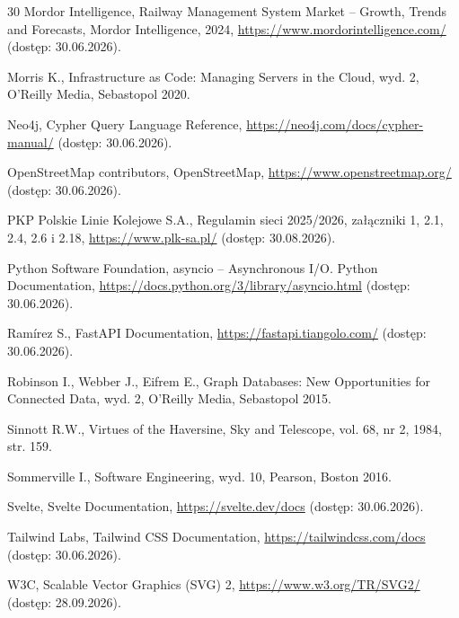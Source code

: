 \documentclass[twoside]{projektInzynierskiMS1z}
\begin{document}
\begin{thebibliography}{30}
 Mordor Intelligence, Railway Management System Market -- Growth, Trends and Forecasts, Mordor Intelligence, 2024, \url{https://www.mordorintelligence.com/} (dostęp: 30.06.2026).

 Morris K., Infrastructure as Code: Managing Servers in the Cloud, wyd. 2, O'Reilly Media, Sebastopol 2020.

 Neo4j, Cypher Query Language Reference, \url{https://neo4j.com/docs/cypher-manual/} (dostęp: 30.06.2026).

 OpenStreetMap contributors, OpenStreetMap, \url{https://www.openstreetmap.org/} (dostęp: 30.06.2026).

 PKP Polskie Linie Kolejowe S.A., Regulamin sieci 2025/2026, załączniki 1, 2.1, 2.4, 2.6 i 2.18, \url{https://www.plk-sa.pl/} (dostęp: 30.08.2026).

 Python Software Foundation, asyncio -- Asynchronous I/O. Python Documentation, \url{https://docs.python.org/3/library/asyncio.html} (dostęp: 30.06.2026).

 Ramírez S., FastAPI Documentation, \url{https://fastapi.tiangolo.com/} (dostęp: 30.06.2026).

 Robinson I., Webber J., Eifrem E., Graph Databases: New Opportunities for Connected Data, wyd. 2, O'Reilly Media, Sebastopol 2015.

 Sinnott R.W., Virtues of the Haversine, Sky and Telescope, vol. 68, nr 2, 1984, str. 159.

 Sommerville I., Software Engineering, wyd. 10, Pearson, Boston 2016.

 Svelte, Svelte Documentation, \url{https://svelte.dev/docs} (dostęp: 30.06.2026).

 Tailwind Labs, Tailwind CSS Documentation, \url{https://tailwindcss.com/docs} (dostęp: 30.06.2026).

 W3C, Scalable Vector Graphics (SVG) 2, \url{https://www.w3.org/TR/SVG2/} (dostęp: 28.09.2026).

\end{thebibliography}
\end{document}
